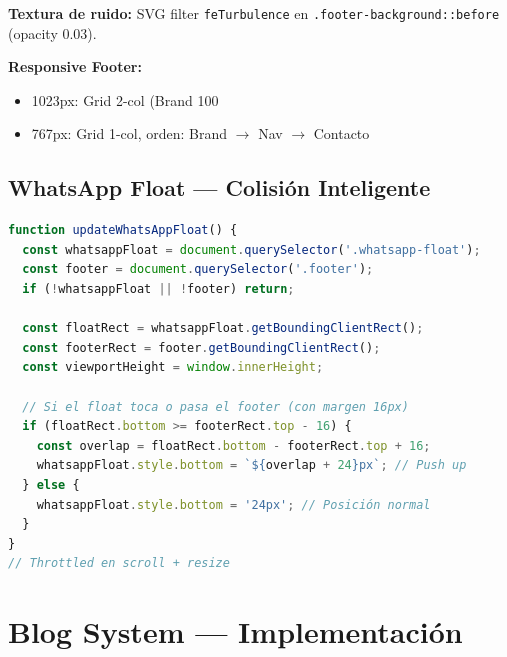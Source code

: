 \documentclass[12pt,a4paper,spanish]{report}
\begin{document}
\textbf{Textura de ruido:} SVG filter \texttt{feTurbulence} en \texttt{.footer-background::before} (opacity 0.03).

\textbf{Responsive Footer:}
\begin{itemize}
    \item 1023px: Grid 2-col (Brand 100%
    \item 767px: Grid 1-col, orden: Brand $\rightarrow$ Nav $\rightarrow$ Contacto
\end{itemize}

\section{WhatsApp Float — Colisión Inteligente}
\begin{lstlisting}[language=JavaScript, caption={WhatsApp Float collision detection}]
function updateWhatsAppFloat() {
  const whatsappFloat = document.querySelector('.whatsapp-float');
  const footer = document.querySelector('.footer');
  if (!whatsappFloat || !footer) return;

  const floatRect = whatsappFloat.getBoundingClientRect();
  const footerRect = footer.getBoundingClientRect();
  const viewportHeight = window.innerHeight;

  // Si el float toca o pasa el footer (con margen 16px)
  if (floatRect.bottom >= footerRect.top - 16) {
    const overlap = floatRect.bottom - footerRect.top + 16;
    whatsappFloat.style.bottom = `${overlap + 24}px`; // Push up
  } else {
    whatsappFloat.style.bottom = '24px'; // Posición normal
  }
}
// Throttled en scroll + resize
\end{lstlisting}

\chapter{Blog System — Implementación}
\label{ch:blog}
\end{document}
